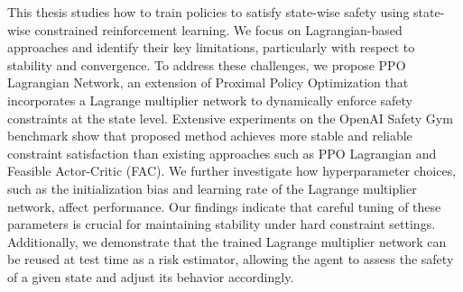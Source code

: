 
\summary

This thesis studies how to train policies to satisfy state-wise safety using state-wise constrained reinforcement learning.
We focus on Lagrangian-based approaches and identify their key limitations, particularly with respect to stability and convergence.
To address these challenges, we propose PPO Lagrangian Network, an extension of Proximal Policy Optimization that incorporates a Lagrange multiplier network to dynamically enforce safety constraints at the state level.
Extensive experiments on the OpenAI Safety Gym benchmark show that proposed method achieves more stable and reliable constraint satisfaction than existing approaches such as PPO Lagrangian and Feasible Actor-Critic (FAC).
We further investigate how hyperparameter choices, such as the initialization bias and learning rate of the Lagrange multiplier network, affect performance.
Our findings indicate that careful tuning of these parameters is crucial for maintaining stability under hard constraint settings.
Additionally, we demonstrate that the trained Lagrange multiplier network can be reused at test time as a risk estimator, allowing the agent to assess the safety of a given state and adjust its behavior accordingly.